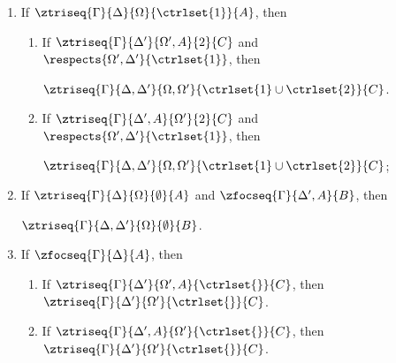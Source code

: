 \begin{theorem}\mbox{}

  \begin{enumerate}
  \item If $\ztriseq{\Gamma}{\Delta}{\Omega}{\ctrlset{1}}{A}$, then
    \begin{enumerate}
    \item If $\ztriseq{\Gamma}{\Delta'}{\Omega', A}{2}{C}$ and
      $\respects{\Omega', \Delta'}{\ctrlset{1}}$, then

      $\ztriseq{\Gamma}{\Delta, \Delta'}{\Omega, \Omega'}{
        \ctrlset{1} \cup \ctrlset{2}}{C}$.
    \item If $\ztriseq{\Gamma}{\Delta', A}{\Omega'}{2}{C}$ and
      $\respects{\Omega', \Delta'}{\ctrlset{1}}$, then

      $\ztriseq{\Gamma}{\Delta, \Delta'}{\Omega, \Omega'}{
        \ctrlset{1} \cup \ctrlset{2}}{C}$;
    \end{enumerate}

  \item If $\ztriseq{\Gamma}{\Delta}{\Omega}{\emptyset}{A}$ and
    $\zfocseq{\Gamma}{\Delta', A}{B}$, then

    $\ztriseq{\Gamma}{\Delta, \Delta'}{\Omega}{\emptyset}{B}$.

  \item If $\zfocseq{\Gamma}{\Delta}{A}$, then
    \begin{enumerate}
    \item If $\ztriseq{\Gamma}{\Delta'}{\Omega', A}{\ctrlset{}}{C}$, then
      $\ztriseq{\Gamma}{\Delta'}{\Omega'}{\ctrlset{}}{C}$.
    \item If $\ztriseq{\Gamma}{\Delta', A}{\Omega'}{\ctrlset{}}{C}$, then
      $\ztriseq{\Gamma}{\Delta'}{\Omega'}{\ctrlset{}}{C}$.
    \end{enumerate}

  \end{enumerate}
\end{theorem}
